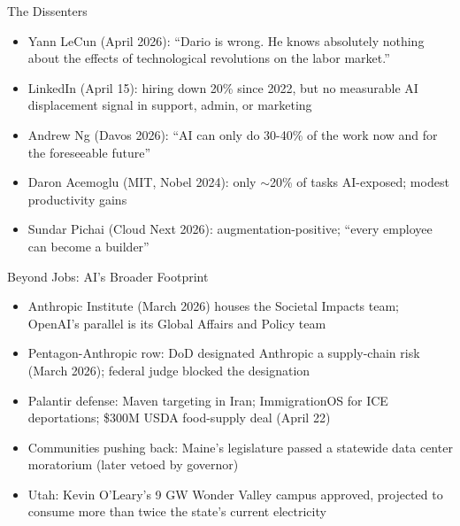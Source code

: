 \documentclass[aspectratio=169]{beamer}
\begin{document}
\begin{frame}{The Dissenters}
    \begin{itemize}
        \item Yann LeCun (April 2026): ``Dario is wrong. He knows absolutely nothing about the effects of technological revolutions on the labor market.''
        \vspace{0.3em}
        \item LinkedIn (April 15): hiring down 20\% since 2022, but no measurable AI displacement signal in support, admin, or marketing
        \vspace{0.3em}
        \item Andrew Ng (Davos 2026): ``AI can only do 30-40\% of the work now and for the foreseeable future''
        \vspace{0.3em}
        \item Daron Acemoglu (MIT, Nobel 2024): only $\sim$20\% of tasks AI-exposed; modest productivity gains
        \vspace{0.3em}
        \item Sundar Pichai (Cloud Next 2026): augmentation-positive; ``every employee can become a builder''
    \end{itemize}
\end{frame}

\begin{frame}{Beyond Jobs: AI's Broader Footprint}
    \begin{itemize}
        \item Anthropic Institute (March 2026) houses the Societal Impacts team; OpenAI's parallel is its Global Affairs and Policy team
        \vspace{0.4em}
        \item Pentagon-Anthropic row: DoD designated Anthropic a supply-chain risk (March 2026); federal judge blocked the designation
        \vspace{0.4em}
        \item Palantir defense: Maven targeting in Iran; ImmigrationOS for ICE deportations; \$300M USDA food-supply deal (April 22)
        \vspace{0.4em}
        \item Communities pushing back: Maine's legislature passed a statewide data center moratorium (later vetoed by governor)
        \vspace{0.4em}
        \item Utah: Kevin O'Leary's 9 GW Wonder Valley campus approved, projected to consume more than twice the state's current electricity
    \end{itemize}
\end{frame}
\end{document}
